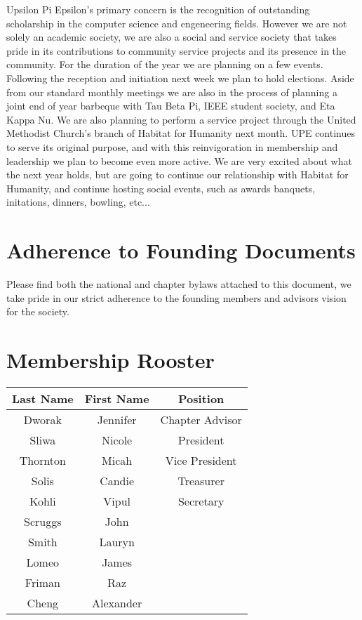 \documentclass{article}
\begin{document}
    Upsilon Pi Epsilon's primary concern is the recognition of outstanding scholarship in the computer science and engeneering fields. However we are not solely an academic society, we are also a social and service society that takes pride in its contributions to community service projects and its presence in the community. For the duration of the year we are planning on a few events. Following the reception and initiation next week we plan to hold elections. Aside from our standard monthly meetings we are also in the process of planning a joint end of year barbeque with Tau Beta Pi, IEEE student society, and Eta Kappa Nu. We are also planning to perform a service project through the United Methodist Church's branch of Habitat for Humanity next month. UPE continues to serve its original purpose, and with this reinvigoration in membership and leadership we plan to become even more active. We are very excited about what the next year holds, but are going to continue our relationship with Habitat for Humanity, and continue hosting social events, such as awards banquets, initations, dinners, bowling, etc... 

\section{Adherence to Founding Documents}

    Please find both the national and chapter bylaws attached to this document, we take pride in our strict adherence to the founding members and advisors vision for the society. 

\section{Membership Rooster}

    \begin{center}
    \begin{tabular}{| c | c | c | }
    \hline
    Last Name & First Name & Position\\\hline\hline
    Dworak & Jennifer & Chapter Advisor \\ \hline
    Sliwa & Nicole & President \\\hline
    Thornton & Micah & Vice President \\\hline
    Solis & Candie & Treasurer \\ \hline
    Kohli & Vipul & Secretary \\ \hline
    Scruggs & John & \\\hline
    Smith & Lauryn & \\\hline
    Lomeo & James & \\\hline
    Friman & Raz & \\
    \hline
    Cheng & Alexander & \\
    \hline



    \end{tabular}
    \end{center}
\end{document}
